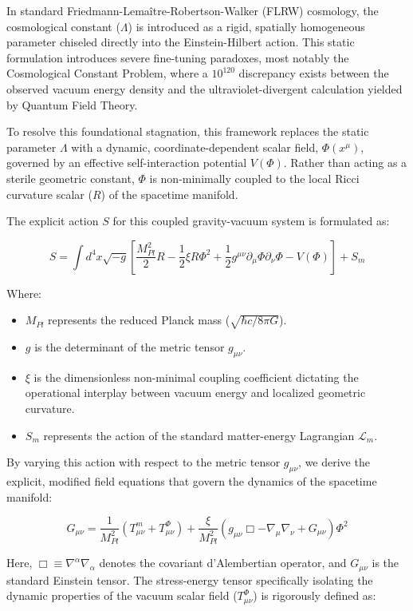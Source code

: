 In standard Friedmann-Lemaître-Robertson-Walker (FLRW) cosmology, the
cosmological constant (\(\Lambda\)) is introduced as a rigid, spatially
homogeneous parameter chiseled directly into the Einstein-Hilbert
action. This static formulation introduces severe fine-tuning paradoxes,
most notably the Cosmological Constant Problem, where a \(10^{120}\)
discrepancy exists between the observed vacuum energy density and the
ultraviolet-divergent calculation yielded by Quantum Field Theory.

To resolve this foundational stagnation, this framework replaces the
static parameter \(\Lambda\) with a dynamic, coordinate-dependent scalar
field, \(\Phi(x^\mu)\), governed by an effective self-interaction
potential \(V(\Phi)\). Rather than acting as a sterile geometric
constant, \(\Phi\) is non-minimally coupled to the local Ricci curvature
scalar (\(R\)) of the spacetime manifold.

The explicit action \(S\) for this coupled gravity-vacuum system is
formulated as:

\[S = \int d^4x \sqrt{-g} \left[ \frac{M_{Pl}^2}{2}R - \frac{1}{2}\xi R\Phi^2 + \frac{1}{2}g^{\mu\nu}\partial_\mu\Phi\partial_\nu\Phi - V(\Phi) \right] + S_m\]

Where:

\begin{itemize}
\tightlist
\item
  \(M_{Pl}\) represents the reduced Planck mass
  (\(\sqrt{\hbar c / 8\pi G}\)).
\item
  \(g\) is the determinant of the metric tensor \(g_{\mu\nu}\).
\item
  \(\xi\) is the dimensionless non-minimal coupling coefficient
  dictating the operational interplay between vacuum energy and
  localized geometric curvature.
\item
  \(S_m\) represents the action of the standard matter-energy Lagrangian
  \(\mathcal{L}_m\).
\end{itemize}

By varying this action with respect to the metric tensor \(g_{\mu\nu}\),
we derive the explicit, modified field equations that govern the
dynamics of the spacetime manifold:

\[G_{\mu\nu} = \frac{1}{M_{Pl}^2} \left( T_{\mu\nu}^m + T_{\mu\nu}^\Phi \right) + \frac{\xi}{M_{Pl}^2} \left( g_{\mu\nu}\Box - \nabla_\mu\nabla_\nu + G_{\mu\nu} \right)\Phi^2\]

Here, \(\Box \equiv \nabla^\alpha \nabla_\alpha\) denotes the covariant
d'Alembertian operator, and \(G_{\mu\nu}\) is the standard Einstein
tensor. The stress-energy tensor specifically isolating the dynamic
properties of the vacuum scalar field (\(T_{\mu\nu}^\Phi\)) is
rigorously defined as:

